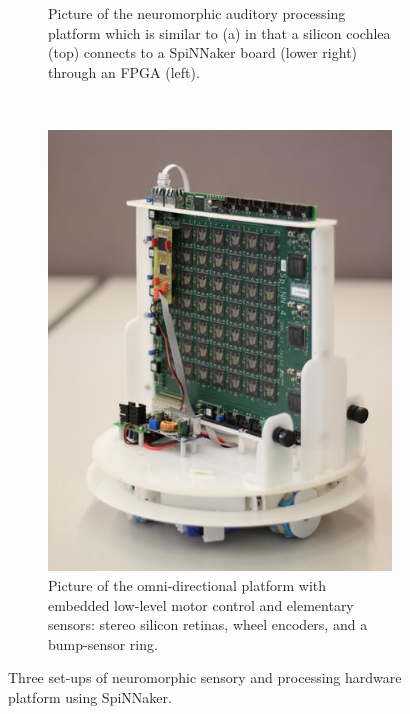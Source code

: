 \begin{figure}[tbp!]
\begin{subfigure}[t]{0.528\textwidth}
		\caption{Picture of the neuromorphic auditory processing platform which is similar to (a) in that a silicon cochlea (top) connects to a SpiNNaker board (lower right) through an FPGA (left).}
	\end{subfigure}
	~~
	\begin{subfigure}[t]{0.4\textwidth}
		\includegraphics[width=\textwidth]{pics_snn/omnibot.jpg}
		\caption{Picture of the omni-directional platform with embedded low-level motor control and elementary sensors: stereo silicon retinas, wheel encoders, and a bump-sensor ring.}
	\end{subfigure}
	\caption[Neuromorphic hardware systems using SpiNNaker.]{Three set-ups of neuromorphic sensory and processing hardware platform using SpiNNaker.}
	\label{Fig:close-loop}
\end{figure}

